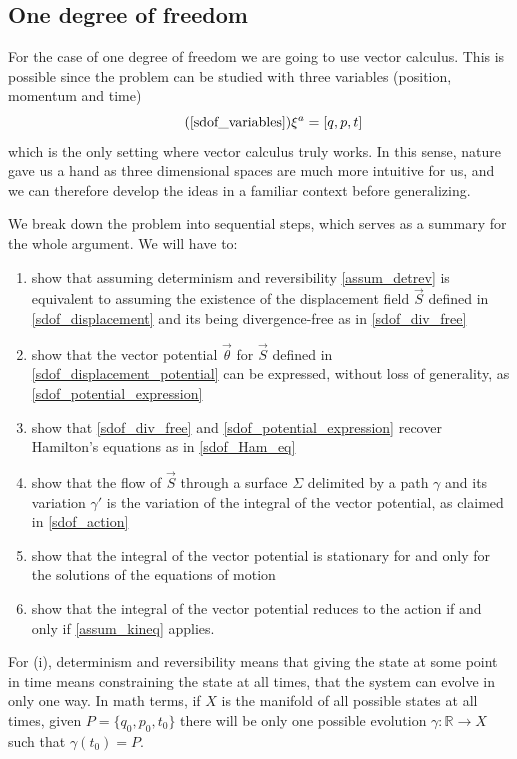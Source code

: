 \documentclass[fleqn,10pt]{wlscirep}
\begin{document}
\subsection*{One degree of freedom}

For the case of one degree of freedom we are going to use vector calculus. This is possible since the problem can be studied with three variables (position, momentum and time)
\begin{equation}
\tag*{(\ref{sdof_variables})}
	\xi^a = [ q, p, t]
\end{equation}
which is the only setting where vector calculus truly works. In this sense, nature gave us a hand as three dimensional spaces are much more intuitive for us, and we can therefore develop the ideas in a familiar context before generalizing.

We break down the problem into sequential steps, which serves as a summary for the whole argument. We will have to:
\begin{enumerate}[label=(\roman*)]
	\item show that assuming determinism and reversibility \ref{assum_detrev} is equivalent to assuming the existence of the displacement field $\vec{S}$ defined in \ref{sdof_displacement} and its being divergence-free as in \ref{sdof_div_free}
	\item show that the vector potential $\vec{\theta}$ for $\vec{S}$ defined in \ref{sdof_displacement_potential} can be expressed, without loss of generality, as \ref{sdof_potential_expression}
	\item show that \ref{sdof_div_free} and \ref{sdof_potential_expression} recover Hamilton's equations as in \ref{sdof_Ham_eq}
	\item show that the flow of $\vec{S}$ through a surface $\Sigma$ delimited by a path $\gamma$ and its variation $\gamma'$ is the variation of the integral of the vector potential, as claimed in \ref{sdof_action}
	\item show that the integral of the vector potential is stationary for and only for the solutions of the equations of motion
	\item show that the integral of the vector potential reduces to the action if and only if \ref{assum_kineq} applies.
\end{enumerate}

For (i), determinism and reversibility means that giving the state at some point in time means constraining the state at all times, that the system can evolve in only one way. In math terms, if $X$ is the manifold of all possible states at all times, given $P = \{q_0, p_0, t_0\}$ there will be only one possible evolution $\gamma : \mathbb{R} \to X$ such that $\gamma(t_0) = P$.
\end{document}
